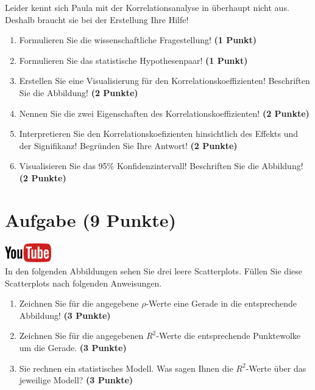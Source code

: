 \documentclass[a4paper, 9pt]{scrartcl}\usepackage[]{graphicx}\usepackage[]{xcolor}
\begin{document}
Leider kennt sich Paula mit der Korrelationsanalyse in \Rlogo überhaupt nicht aus. Deshalb braucht sie bei der Erstellung Ihre Hilfe!

\begin{enumerate}
  \item Formulieren Sie die wissenschaftliche Fragestellung! \textbf{(1 Punkt)}
  \item Formulieren Sie das statistische Hypothesenpaar! \textbf{(1 Punkt)}
\item Erstellen Sie eine Visualisierung für den Korrelationskoeffizienten! Beschriften Sie die Abbildung! \textbf{(2 Punkte)}
\item Nennen Sie die zwei Eigenschaften des Korrelationskoeffizienten! \textbf{(2 Punkte)}
\item Interpretieren Sie den Korrelationskoefizienten hinsichtlich des
  Effekts und der Signifikanz! Begründen Sie Ihre Antwort! \textbf{(2 Punkte)}
\item Visualisieren Sie das 95\% Konfidenzintervall! Beschriften Sie die Abbildung! \textbf{(2 Punkte)} 
\end{enumerate} 
\clearpage

\section{Aufgabe \hfill (9 Punkte)}

\hfill\href{https://youtu.be/fB6nF4dxodA}{\includegraphics[width =
  2cm]{img/youtube}}\\[1Ex]


In den folgenden Abbildungen sehen Sie drei leere Scatterplots. F{\"u}llen Sie diese
Scatterplots nach folgenden Anweisungen.

\begin{enumerate}
\item Zeichnen Sie f{\"u}r die angegebene $\rho$-Werte eine Gerade in die
  entsprechende Abbildung! \textbf{(3 Punkte)}
\item Zeichnen Sie f{\"u}r die angegebenen $R^2$-Werte die entsprechende
  Punktewolke um die Gerade. \textbf{(3 Punkte)}
\item Sie rechnen ein statistisches Modell. Was sagen Ihnen die $R^2$-Werte
  {\"u}ber das jeweilige Modell? \textbf{(3 Punkte)}
\end{enumerate}
\end{document}
